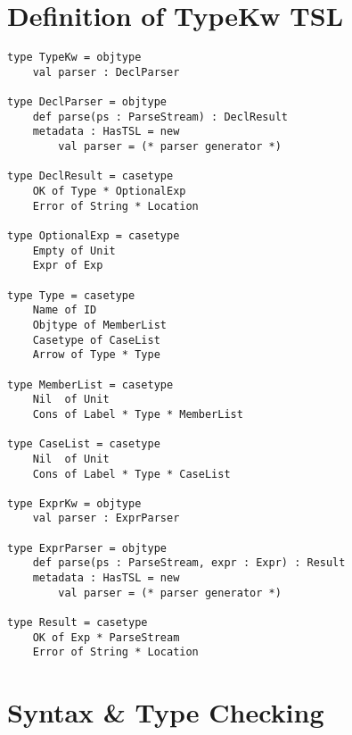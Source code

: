\documentclass[letterpaper, notitlepage]{article}
\begin{document}
\section{Definition of TypeKw TSL}
\begin{lstlisting}[style=wyvern]
type TypeKw = objtype
	val parser : DeclParser

type DeclParser = objtype
	def parse(ps : ParseStream) : DeclResult
	metadata : HasTSL = new 
		val parser = (* parser generator *)

type DeclResult = casetype
	OK of Type * OptionalExp
	Error of String * Location

type OptionalExp = casetype
	Empty of Unit
	Expr of Exp

type Type = casetype
	Name of ID
	Objtype of MemberList
	Casetype of CaseList
	Arrow of Type * Type

type MemberList = casetype
	Nil  of Unit
	Cons of Label * Type * MemberList

type CaseList = casetype
	Nil  of Unit
	Cons of Label * Type * CaseList

type ExprKw = objtype
	val parser : ExprParser

type ExprParser = objtype
	def parse(ps : ParseStream, expr : Expr) : Result
	metadata : HasTSL = new 
		val parser = (* parser generator *)

type Result = casetype
	OK of Exp * ParseStream
	Error of String * Location
\end{lstlisting}

\section{Syntax \& Type Checking}
\end{document}
